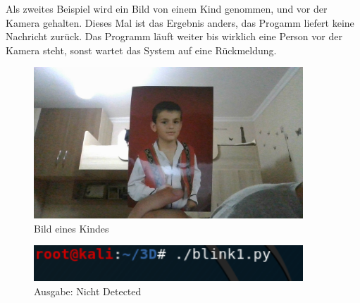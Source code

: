 \newpage
Als zweites Beispiel wird ein Bild von einem Kind genommen, und vor der Kamera gehalten. Dieses Mal ist das Ergebnis anders, das Progamm liefert keine Nachricht zurück. Das Programm läuft weiter bis wirklich eine Person vor der Kamera steht, sonst wartet das System auf eine Rückmeldung.
\begin{figure}[ht]
  \centering
    \includegraphics[width=0.9\textwidth]{./figures/kind.jpg}
      \caption{Bild eines Kindes}
\end{figure}
\begin{figure}[ht]
  \centering
    \includegraphics[width=0.9\textwidth]{./figures/ndetected.png}
      \caption{Ausgabe: Nicht Detected}
\end{figure}
